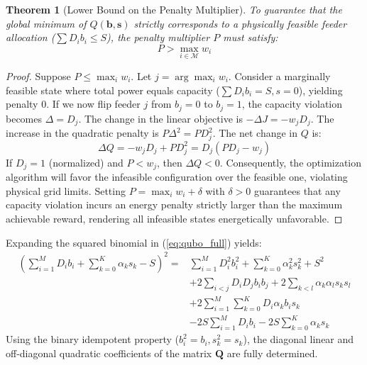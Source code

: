 \documentclass[11pt,a4paper]{article}
\newtheorem{theorem}{Theorem}
\theoremstyle{definition}
\theoremstyle{remark}
\begin{document}
\begin{theorem}[Lower Bound on the Penalty Multiplier]
\label{thm:penalty_bound}
To guarantee that the global minimum of $Q(\mathbf{b}, \mathbf{s})$ strictly corresponds to a physically feasible feeder allocation ($\sum D_i b_i \le S$), the penalty multiplier $P$ must satisfy:
\begin{equation}
P > \max_{i \in \mathcal{M}} w_i
\end{equation}
\end{theorem}

\begin{proof}
Suppose $P \le \max_{i} w_i$. Let $j = \arg\max_i w_i$. Consider a marginally feasible state where total power equals capacity ($\sum D_i b_i = S, s = 0$), yielding penalty $0$. If we now flip feeder $j$ from $b_j = 0$ to $b_j = 1$, the capacity violation becomes $\Delta = D_j$. The change in the linear objective is $-\Delta J = -w_j D_j$. The increase in the quadratic penalty is $P \Delta^2 = P D_j^2$. The net change in $Q$ is:
\begin{equation}
\Delta Q = -w_j D_j + P D_j^2 = D_j (P D_j - w_j)
\end{equation}
If $D_j = 1$ (normalized) and $P < w_j$, then $\Delta Q < 0$. Consequently, the optimization algorithm will favor the infeasible configuration over the feasible one, violating physical grid limits. Setting $P = \max_i w_i + \delta$ with $\delta > 0$ guarantees that any capacity violation incurs an energy penalty strictly larger than the maximum achievable reward, rendering all infeasible states energetically unfavorable.
\end{proof}

Expanding the squared binomial in (\ref{eq:qubo_full}) yields:
\begin{align}
\left( \sum_{i=1}^M D_i b_i + \sum_{k=0}^K \alpha_k s_k - S \right)^2 = & \sum_{i=1}^M D_i^2 b_i^2 + \sum_{k=0}^K \alpha_k^2 s_k^2 + S^2 \nonumber \\
& + 2 \sum_{i < j} D_i D_j b_i b_j + 2 \sum_{k < l} \alpha_k \alpha_l s_k s_l \nonumber \\
& + 2 \sum_{i=1}^M \sum_{k=0}^K D_i \alpha_k b_i s_k \nonumber \\
& - 2S \sum_{i=1}^M D_i b_i - 2S \sum_{k=0}^K \alpha_k s_k
\end{align}
Using the binary idempotent property ($b_i^2 = b_i, s_k^2 = s_k$), the diagonal linear and off-diagonal quadratic coefficients of the matrix $\mathbf{Q}$ are fully determined.
\end{document}
